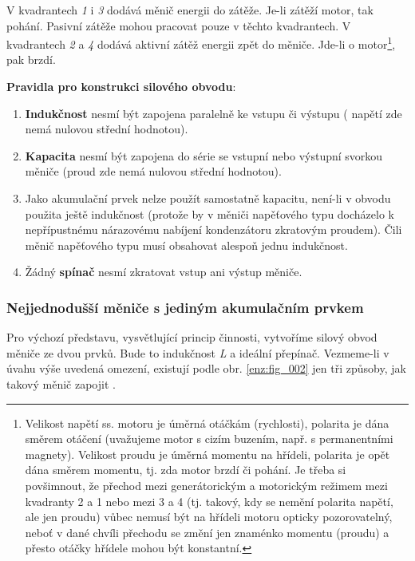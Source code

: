 
      V kvadrantech \emph{1} i \emph{3} dodává měnič energii do zátěže. Je-li zátěží motor, tak
      pohání. Pasivní zátěže mohou pracovat pouze v těchto kvadrantech. V kvadrantech \emph{2} a
      \emph{4} dodává aktivní zátěž energii zpět do měniče. Jde-li o motor\footnote{Velikost
      napětí ss. motoru je úměrná otáčkám (rychlosti), polarita je dána směrem otáčení
      (uvažujeme motor s cizím buzením, např. s permanentními magnety). Velikost proudu je
      úměrná momentu na hřídeli, polarita je opět dána směrem momentu, tj. zda motor brzdí či
      pohání. Je třeba si povšimnout, že přechod mezi generátorickým a motorickým režimem mezi
      kvadranty 2 a 1 nebo mezi 3 a 4 (tj. takový, kdy se nemění polarita napětí, ale jen
      proudu) vůbec nemusí být na hřídeli motoru opticky pozorovatelný, neboť v dané chvíli
      přechodu se změní jen znaménko momentu (proudu) a přesto otáčky hřídele mohou být
      konstantní.}, pak brzdí.
      
      \textbf{Pravidla pro konstrukci silového obvodu}:
      \begin{enumerate}[noitemsep]
        \item \textbf{Indukčnost} nesmí být zapojena paralelně ke vstupu či výstupu ( napětí zde 
              nemá nulovou střední hodnotou).
        \item \textbf{Kapacita} nesmí být zapojena do série se vstupní nebo výstupní svorkou 
              měniče (proud zde nemá nulovou střední hodnotou).
        \item Jako akumulační prvek nelze použít samostatně kapacitu, není-li v obvodu použita
              ještě indukčnost (protože by v měniči napěťového typu docházelo k nepřípustnému
              nárazovému nabíjení kondenzátoru zkratovým proudem). Čili měnič napěťového typu
              musí obsahovat alespoň jednu indukčnost.
        \item Žádný \textbf{spínač} nesmí zkratovat vstup ani výstup měniče.
      \end{enumerate}
      
      \subsubsection{Nejjednodušší měniče s jediným akumulačním 
        prvkem}\label{ENZ:tit_menice_s_1_aku_prvkem} 
        Pro výchozí představu, vysvětlující princip činnosti, vytvoříme silový obvod měniče ze
        dvou prvků. Bude to indukčnost  \emph{L} a ideální přepínač. Vezmeme-li v úvahu výše 
        uvedená omezení, existují podle obr. \ref{enz:fig_002} jen tři způsoby, jak takový měnič 
        zapojit \cite{Patocka}.
      
